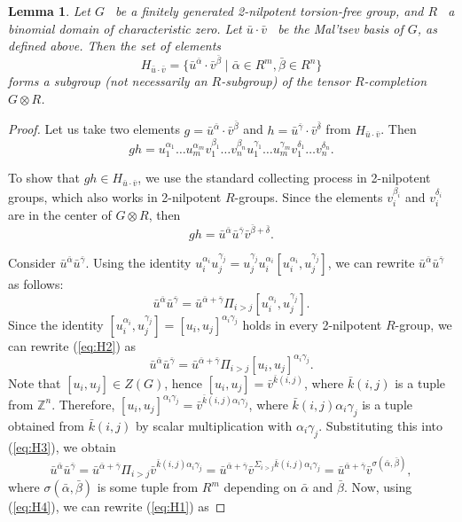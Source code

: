 \documentclass[11pt]{article}
\def\Z{{\mathbb Z}}
\newtheorem{lemma}{Lemma}[section]
\theoremstyle{definition}
\begin{document}
\begin{lemma}
Let $G$~ be a finitely generated 2-nilpotent torsion-free group, and $R$~ a binomial domain of characteristic zero. Let $\bar u \cdot \bar v$~ be the Mal'tsev basis of $G$, as defined above. Then the set of elements
$$
H_{\bar u \cdot \bar v} = \{ \bar u^{\bar\alpha} \cdot \bar v^{\bar \beta} \mid \bar \alpha \in R^m, \bar \beta \in R^n\}
$$
forms a subgroup (not necessarily an $R$-subgroup) of the tensor $R$-completion $G \otimes R$.
\end{lemma}
\begin{proof}
Let us take two elements $g = \bar u^{\bar\alpha} \cdot \bar v^{\bar \beta}$ and $h = \bar u^{\bar\gamma} \cdot \bar v^{\bar \delta}$ from $H_{\bar u \cdot \bar v}$. Then
$$
gh = u_1^{\alpha_1} \ldots u_m^{\alpha_m}v_1^{\beta_1} \ldots v_n^{\beta_n} u_1^{\gamma_1} \ldots u_m^{\gamma_m}v_1^{\delta_1} \ldots v_n^{\delta_n}.
$$

To show that $gh \in H_{\bar u \cdot \bar v}$, we use the standard collecting process in 2-nilpotent groups, which also works in 2-nilpotent $R$-groups.
Since the elements $v_i^{\beta_i}$ and $v_i^{\delta_i}$ are in the center of $G \otimes R$, then
\begin{equation} \label{eq:H1}
gh = \bar u^{\bar \alpha} \bar u^{\bar \gamma} \bar v^{\bar \beta +\bar \delta}.
\end{equation}

Consider $\bar u^{\bar \alpha} \bar u^{\bar \gamma}$. Using the identity $u_i^{\alpha_i}u_j^{\gamma_j} = u_j^{\gamma_j} u_i^{\alpha_i }[u_i^{\alpha_i },u_j^{\gamma_j}]$, we can rewrite $\bar u^{\bar \alpha} \bar u^{\bar \gamma}$ as follows:
\begin{equation} \label{eq:H2}
\bar u^{\bar \alpha} \bar u^{\bar \gamma} = \bar u^{\bar \alpha +\bar \gamma} \Pi_{i>j}
[u_i^{\alpha_i },u_j^{\gamma_j}].
\end{equation}
Since the identity $[u_i^{\alpha_i },u_j^{\gamma_j}] = [u_i,u_j]^{\alpha_i \gamma_j}$ holds in every 2-nilpotent $R$-group, we can rewrite (\ref{eq:H2}) as
\begin{equation}\label{eq:H3}
\bar u^{\bar \alpha} \bar u^{\bar \gamma} = \bar u^{\bar \alpha +\bar \gamma} \Pi_{i>j}[u_i,u_j]^{\alpha_i \gamma_j}.
\end{equation}
Note that $[u_i,u_j] \in Z(G)$, hence $[u_i,u_j] = \bar v^{\bar k(i,j)}$, where $\bar k(i,j)$ is a tuple from $\Z^n$. Therefore, $[u_i,u_j]^{\alpha_i \gamma_j} = \bar v^{\bar k(i,j)\alpha_i \gamma_j}$, where $\bar k(i,j)\alpha_i \gamma_j$ is a tuple obtained from $\bar k(i,j)$ by scalar multiplication with $\alpha_i \gamma_j$. Substituting this into (\ref{eq:H3}), we obtain
\begin{equation} \label{eq:H4}
\bar u^{\bar \alpha} \bar u^{\bar \gamma} = \bar u^{\bar \alpha +\bar \gamma} \Pi_{i>j}
\bar v^{\bar k(i,j)\alpha_i \gamma_j} = \bar u^{\bar \alpha +\bar \gamma} \bar v^{\Sigma_{i>j}\bar k(i,j)\alpha_i \gamma_j} = \bar u^{\bar \alpha +\bar \gamma} \bar v^{\sigma(\bar \alpha, \bar \beta)},
\end{equation}
where $\sigma(\bar \alpha,\bar \beta)$ is some tuple from $R^m$ depending on $\bar \alpha$ and $\bar \beta$. Now, using (\ref{eq:H4}), we can rewrite (\ref{eq:H1}) as


\end{proof}
\end{document}
